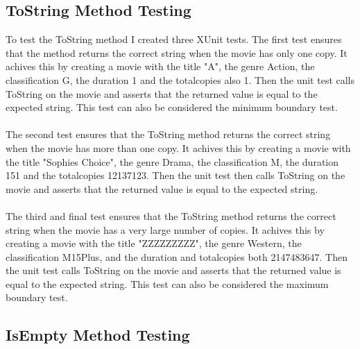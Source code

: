 \documentclass[12pt,a4paper]{article}
\begin{document}
		\subsection{ToString Method Testing}
			To test the ToString method I created three XUnit tests. The first test 
			ensures that the method returns the correct string when the movie has 
			only one copy. It achives this by creating a movie with the title "A", 
			the genre Action, the classification G, the duration 1 and the totalcopies 
			also 1. Then the unit test calls ToString on the movie and asserts that 
			the returned value is equal to the expected string. This test can also be 
			considered the minimum boundary test.\\
			\\
			The second test ensures that the ToString method returns the correct 
			string when the movie has more than one copy. It achives this by creating 
			a movie with the title "Sophies Choice", the genre Drama, the classification 
			M, the duration 151 and the totalcopies 12137123. Then the unit test then 
			calls ToString on the movie and asserts that the returned value is equal 
			to the expected string.\\
			\\
			The third and final test ensures that the ToString method returns the 
			correct string when the movie has a very large number of copies. It 
			achives this by creating a movie with the title "ZZZZZZZZZ", the genre 
			Western, the classification M15Plus, and the duration and totalcopies 
			both 2147483647. Then the unit test calls ToString on the movie and 
			asserts that the returned value is equal to the expected string. This 
			test can also be considered the maximum boundary test.\\

		\newpage

		\subsection{IsEmpty Method Testing}
			
\end{document}

